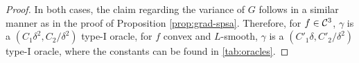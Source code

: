 \begin{proof}
In both cases, the claim regarding the variance of $G$ follows in a similar manner as in the proof of Proposition \ref{prop:grad-spsa}.
Therefore, for $f \in \mathcal{C}^3$, $\gamma$ is a $(C_1\delta^2, C_2/\delta^2)$ type-I oracle, for $f$ convex and $L$-smooth, $\gamma$ is a $(C'_1\delta, C'_2/\delta^2)$ type-I oracle, where the constants can be found in \cref{tab:oracles}.


\end{proof}
